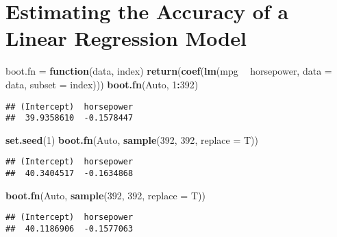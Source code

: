 \documentclass[
]{article}
\newenvironment{Shaded}{\begin{snugshade}}{\end{snugshade}}
\newcommand{\ControlFlowTok}[1]{\textcolor[rgb]{0.13,0.29,0.53}{\textbf{#1}}}
\newcommand{\DataTypeTok}[1]{\textcolor[rgb]{0.13,0.29,0.53}{#1}}
\newcommand{\DecValTok}[1]{\textcolor[rgb]{0.00,0.00,0.81}{#1}}
\newcommand{\KeywordTok}[1]{\textcolor[rgb]{0.13,0.29,0.53}{\textbf{#1}}}
\newcommand{\NormalTok}[1]{#1}
\newcommand{\OperatorTok}[1]{\textcolor[rgb]{0.81,0.36,0.00}{\textbf{#1}}}
\newcommand{\StringTok}[1]{\textcolor[rgb]{0.31,0.60,0.02}{#1}}
\begin{document}
\hypertarget{estimating-the-accuracy-of-a-linear-regression-model}{%
\section{Estimating the Accuracy of a Linear Regression
Model}\label{estimating-the-accuracy-of-a-linear-regression-model}}

\begin{Shaded}
\begin{Highlighting}[]
\NormalTok{boot.fn =}\StringTok{ }\ControlFlowTok{function}\NormalTok{(data, index)}
  \KeywordTok{return}\NormalTok{(}\KeywordTok{coef}\NormalTok{(}\KeywordTok{lm}\NormalTok{(mpg }\OperatorTok{~}\StringTok{ }\NormalTok{horsepower, }\DataTypeTok{data =}\NormalTok{ data, }\DataTypeTok{subset =}\NormalTok{ index)))}
\KeywordTok{boot.fn}\NormalTok{(Auto, }\DecValTok{1}\OperatorTok{:}\DecValTok{392}\NormalTok{)}
\end{Highlighting}
\end{Shaded}

\begin{verbatim}
## (Intercept)  horsepower 
##  39.9358610  -0.1578447
\end{verbatim}

\begin{Shaded}
\begin{Highlighting}[]
\KeywordTok{set.seed}\NormalTok{(}\DecValTok{1}\NormalTok{)}
\KeywordTok{boot.fn}\NormalTok{(Auto, }\KeywordTok{sample}\NormalTok{(}\DecValTok{392}\NormalTok{, }\DecValTok{392}\NormalTok{, }\DataTypeTok{replace =}\NormalTok{ T))}
\end{Highlighting}
\end{Shaded}

\begin{verbatim}
## (Intercept)  horsepower 
##  40.3404517  -0.1634868
\end{verbatim}

\begin{Shaded}
\begin{Highlighting}[]
\KeywordTok{boot.fn}\NormalTok{(Auto, }\KeywordTok{sample}\NormalTok{(}\DecValTok{392}\NormalTok{, }\DecValTok{392}\NormalTok{, }\DataTypeTok{replace =}\NormalTok{ T))}
\end{Highlighting}
\end{Shaded}

\begin{verbatim}
## (Intercept)  horsepower 
##  40.1186906  -0.1577063
\end{verbatim}
\end{document}
